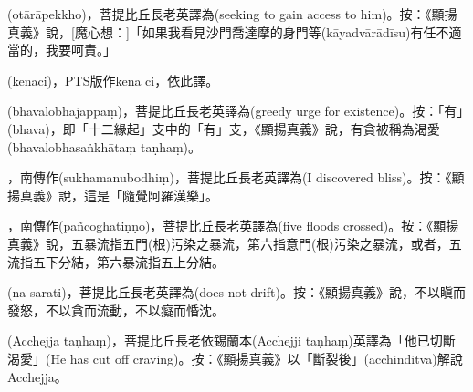 \startitemgroup[noteitems]
\item{}(otārāpekkho)，菩提比丘長老英譯為(seeking to gain access to him)。按：《顯揚真義》說，[魔心想：]「如果我看見沙門喬達摩的身門等(kāyadvārādīsu)有任不適當的，我要呵責。」
\stopitemgroup

\startitemgroup[noteitems]
\item{}(kenaci)，PTS版作kena ci，依此譯。
\stopitemgroup

\startitemgroup[noteitems]
\item{}(bhavalobhajappaṃ)，菩提比丘長老英譯為(greedy urge for existence)。按：「有」(bhava)，即「十二緣起」支中的「有」支，《顯揚真義》說，有貪被稱為渴愛(bhavalobhasaṅkhātaṃ taṇhaṃ)。
\stopitemgroup

\startitemgroup[noteitems]
\item{}，南傳作(sukhamanubodhiṃ)，菩提比丘長老英譯為(I discovered bliss)。按：《顯揚真義》說，這是「隨覺阿羅漢樂」。
\stopitemgroup

\startitemgroup[noteitems]
\item{}，南傳作(pañcoghatiṇṇo)，菩提比丘長老英譯為(five floods crossed)。按：《顯揚真義》說，五暴流指五門(根)污染之暴流，第六指意門(根)污染之暴流，或者，五流指五下分結，第六暴流指五上分結。
\stopitemgroup

\startitemgroup[noteitems]
\item{}(na sarati)，菩提比丘長老英譯為(does not drift)。按：《顯揚真義》說，不以瞋而發怒，不以貪而流動，不以癡而惛沈。
\stopitemgroup

\startitemgroup[noteitems]
\item{}(Acchejja taṇhaṃ)，菩提比丘長老依錫蘭本(Acchejji taṇhaṃ)英譯為「他已切斷渴愛」(He has cut off craving)。按：《顯揚真義》以「斷裂後」(acchinditvā)解說Acchejja。
\stopitemgroup

